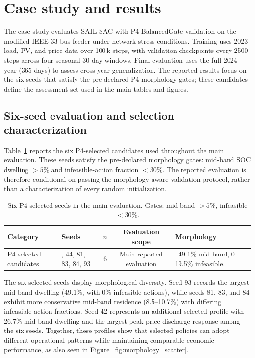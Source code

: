 \section{Case study and results}
\label{sec:case_study}

The case study evaluates SAIL-SAC with P4 BalancedGate validation on the modified IEEE 33-bus feeder under network-stress conditions. Training uses 2023 load, PV, and price data over 100\,k steps, with validation checkpoints every 2500 steps across four seasonal 30-day windows. Final evaluation uses the full 2024 year (365 days) to assess cross-year generalization. The reported results focus on the six seeds that satisfy the pre-declared P4 morphology gates; these candidates define the assessment set used in the main tables and figures.

\subsection{Six-seed evaluation and selection characterization}

Table~\ref{tab:p4_selected_seeds} reports the six P4-selected candidates used throughout the main evaluation. These seeds satisfy the pre-declared morphology gates: mid-band SOC dwelling $>5\%$ and infeasible-action fraction $<30\%$. The reported evaluation is therefore conditional on passing the morphology-aware validation protocol, rather than a characterization of every random initialization.

\begin{table}[!t]
\centering
\footnotesize
\setlength{\tabcolsep}{5pt}
\renewcommand{\arraystretch}{1.1}
\caption{Six P4-selected seeds in the main evaluation. Gates: mid-band $>5\%$, infeasible $<30\%$.}
\label{tab:p4_selected_seeds}
\begin{tabular}{l>{\raggedright\arraybackslash}p{4.0cm}cc>{\raggedright\arraybackslash}p{5.4cm}}
\toprule
Category & Seeds & $n$ & Evaluation scope & Morphology \\
\midrule
P4-selected candidates & 42, 44, 81, 83, 84, 93 & 6 & Main reported evaluation & 8.5--49.1\% mid-band, 0--19.5\% infeasible. \\
\bottomrule
\end{tabular}
\end{table}

The six selected seeds display morphological diversity. Seed 93 records the largest mid-band dwelling (49.1\%, with 0\% infeasible actions), while seeds 81, 83, and 84 exhibit more conservative mid-band residence (8.5--10.7\%) with differing infeasible-action fractions. Seed 42 represents an additional selected profile with 26.7\% mid-band dwelling and the largest peak-price discharge response among the six seeds. Together, these profiles show that selected policies can adopt different operational patterns while maintaining comparable economic performance, as also seen in Figure~\ref{fig:morphology_scatter}.

